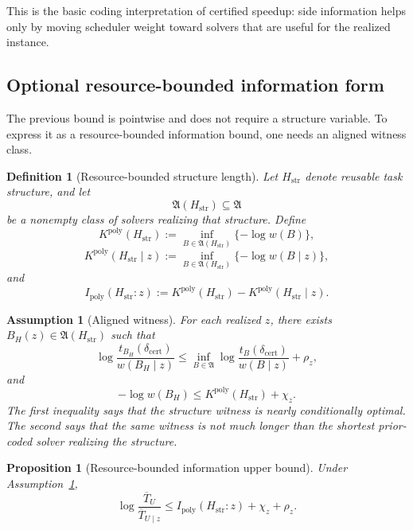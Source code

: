 \documentclass{article}
\newtheorem{assumption}{Assumption}
\newtheorem{definition}{Definition}
\newtheorem{proposition}{Proposition}
\begin{document}
This is the basic coding interpretation of certified speedup: side information helps only
by moving scheduler weight toward solvers that are useful for the realized instance.

\subsection{Optional resource-bounded information form}

The previous bound is pointwise and does not require a structure variable.
To express it as a resource-bounded information bound, one needs an aligned witness class.

\begin{definition}[Resource-bounded structure length]
\label{def:app-ipoly}
Let \(H_{\mathrm{str}}\) denote reusable task structure, and let
\[
    \mathfrak A(H_{\mathrm{str}})\subseteq \mathfrak A
\]
be a nonempty class of solvers realizing that structure.  Define
\[
    K^{\mathrm{poly}}(H_{\mathrm{str}})
    :=
    \inf_{B\in\mathfrak A(H_{\mathrm{str}})}
    \{-\log w(B)\},
\]
\[
    K^{\mathrm{poly}}(H_{\mathrm{str}}\mid z)
    :=
    \inf_{B\in\mathfrak A(H_{\mathrm{str}})}
    \{-\log w(B\mid z)\},
\]
and
\[
    I_{\mathrm{poly}}(H_{\mathrm{str}}:z)
    :=
    K^{\mathrm{poly}}(H_{\mathrm{str}})
    -
    K^{\mathrm{poly}}(H_{\mathrm{str}}\mid z).
\]
\end{definition}

\begin{assumption}[Aligned witness]
\label{ass:app-aligned-witness}
For each realized \(z\), there exists
\(B_H(z)\in\mathfrak A(H_{\mathrm{str}})\) such that
\[
    \log\frac{t_{B_H}(\delta_{\mathrm{cert}})}{w(B_H\mid z)}
    \le
    \inf_{B\in\mathfrak A}
    \log\frac{t_B(\delta_{\mathrm{cert}})}{w(B\mid z)}
    +
    \rho_z,
\]
and
\[
    -\log w(B_H)
    \le
    K^{\mathrm{poly}}(H_{\mathrm{str}})+\chi_z.
\]
The first inequality says that the structure witness is nearly conditionally optimal.
The second says that the same witness is not much longer than the shortest prior-coded
solver realizing the structure.
\end{assumption}

\begin{proposition}[Resource-bounded information upper bound]
\label{prop:app-ipoly-bound}
Under Assumption~\ref{ass:app-aligned-witness},
\[
    \log\frac{\overline T_U}{\overline T_{U\mid z}}
    \le
    I_{\mathrm{poly}}(H_{\mathrm{str}}:z)+\chi_z+\rho_z.
\]
\end{proposition}
\end{document}
